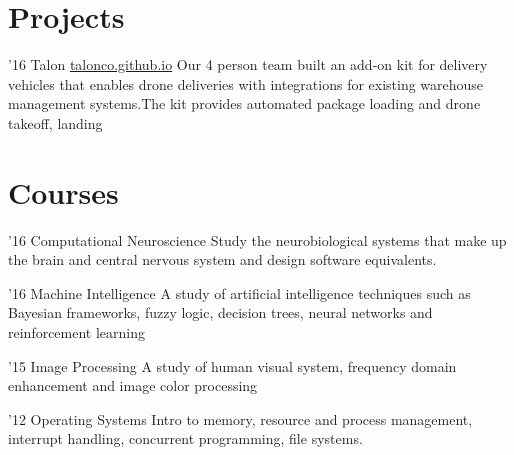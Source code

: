 \documentclass{tccv}
\begin{document}
\section{Projects}

\begin{yearlist}

\item{'16}
  {Talon \href{http://talonco.github.io}{talonco.github.io}}
  {Our 4 person team built an add-on kit for delivery vehicles that enables drone deliveries with integrations for existing warehouse management systems.The kit provides automated package loading and drone takeoff, landing}

\end{yearlist}

\section{Courses}

\begin{yearlist}

\item{'16} {Computational Neuroscience} {Study the neurobiological systems that
    make up the brain and central nervous system and design software
    equivalents.}

\item{'16} {Machine Intelligence} {A study of artificial intelligence techniques
    such as Bayesian frameworks, fuzzy logic, decision trees, neural networks
    and reinforcement learning}

\item{'15}
  {Image Processing}
  {A study of human visual system, frequency domain enhancement and image color processing}
\item{'12} {Operating Systems} {Intro to memory, resource and process
    management, interrupt handling, concurrent programming, file systems.}



\end{yearlist}


\end{document}
